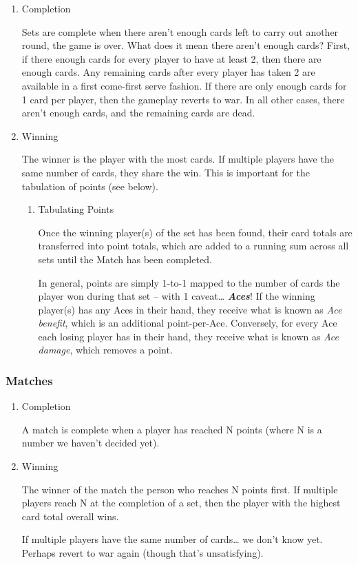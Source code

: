 \documentclass[11pt]{article}
\begin{document}
\begin{enumerate}
\item Completion
\label{sec-2-2-3-1}

Sets are complete when there aren't enough cards left to carry out
another round, the game is over. What does it mean there aren't enough
cards? First, if there enough cards for every player to have at least
2, then there are enough cards. Any remaining cards after every player
has taken 2 are available in a first come-first serve fashion. If
there are only enough cards for 1 card per player, then the gameplay
reverts to war. In all other cases, there aren't enough cards, and the
remaining cards are dead.

\item Winning
\label{sec-2-2-3-2}

The winner is the player with the most cards. If multiple players have
the same number of cards, they share the win. This is important for
the tabulation of points (see below).

\begin{enumerate}
\item Tabulating Points
\label{sec-2-2-3-2-1}

Once the winning player(s) of the set has been found, their card
totals are transferred into point totals, which are added to a running
sum across all sets until the Match has been completed. 

In general, points are simply 1-to-1 mapped to the number of cards the
player won during that set -- with 1 caveat\ldots{} \textbf{\emph{Aces}}! If the winning
player(s) has any Aces in their hand, they receive what is known as
\emph{Ace benefit}, which is an additional point-per-Ace. Conversely, for
every Ace each losing player has in their hand, they receive what is
known as \emph{Ace damage}, which removes a point.
\end{enumerate}
\end{enumerate}

\subsubsection{Matches}
\label{sec-2-2-4}
\begin{enumerate}
\item Completion
\label{sec-2-2-4-1}

A match is complete when a player has reached N points (where N is a
number we haven't decided yet).

\item Winning
\label{sec-2-2-4-2}

The winner of the match the person who reaches N points first. If
multiple players reach N at the completion of a set, then the player
with the highest card total overall wins. 

If multiple players have the same number of cards\ldots{} we don't know
yet. Perhaps revert to war again (though that's unsatisfying).
\end{enumerate}
\end{document}
